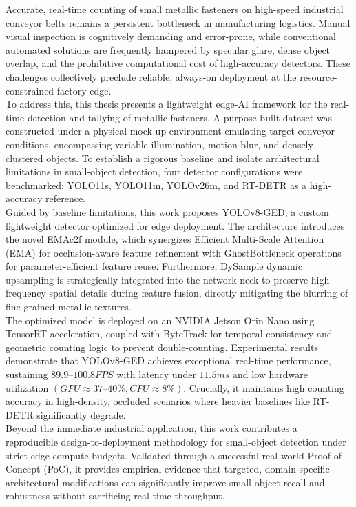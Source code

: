 Accurate, real-time counting of small metallic fasteners on high-speed industrial conveyor belts remains a persistent bottleneck in manufacturing logistics. Manual visual inspection is cognitively demanding and error-prone, while conventional automated solutions are frequently hampered by specular glare, dense object overlap, and the prohibitive computational cost of high-accuracy detectors. These challenges collectively preclude reliable, always-on deployment at the resource-constrained factory edge.\\

To address this, this thesis presents a lightweight edge-AI framework for the real-time detection and tallying of metallic fasteners. A purpose-built dataset was constructed under a physical mock-up environment emulating target conveyor conditions, encompassing variable illumination, motion blur, and densely clustered objects. To establish a rigorous baseline and isolate architectural limitations in small-object detection, four detector configurations were benchmarked: YOLO11s, YOLO11m, YOLOv26m, and RT-DETR as a high-accuracy reference.\\

Guided by baseline limitations, this work proposes YOLOv8-GED, a custom lightweight detector optimized for edge deployment. The architecture introduces the novel EMAc2f module, which synergizes Efficient Multi-Scale Attention (EMA) for occlusion-aware feature refinement with GhostBottleneck operations for parameter-efficient feature reuse. Furthermore, DySample dynamic upsampling is strategically integrated into the network neck to preserve high-frequency spatial details during feature fusion, directly mitigating the blurring of fine-grained metallic textures.\\

The optimized model is deployed on an NVIDIA Jetson Orin Nano using TensorRT acceleration, coupled with ByteTrack for temporal consistency and geometric counting logic to prevent double-counting. Experimental results demonstrate that YOLOv8-GED achieves exceptional real-time performance, sustaining $89.9–100.8 FPS$ with latency under $11.5 ms$ and low hardware utilization $(GPU \approx 37–40 \%, CPU \approx 8 \%)$. Crucially, it maintains high counting accuracy in high-density, occluded scenarios where heavier baselines like RT-DETR significantly degrade.\\

Beyond the immediate industrial application, this work contributes a reproducible design-to-deployment methodology for small-object detection under strict edge-compute budgets. Validated through a successful real-world Proof of Concept (PoC), it provides empirical evidence that targeted, domain-specific architectural modifications can significantly improve small-object recall and robustness without sacrificing real-time throughput.